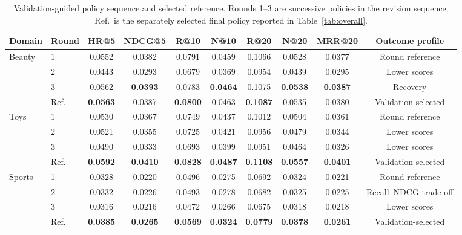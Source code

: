 \begin{table}[b]
\centering
\caption{Validation-guided policy sequence and selected reference. Rounds 1--3 are successive policies in the revision sequence; Ref.\ is the separately selected final policy reported in Table~\ref{tab:overall}.}
\label{tab:three-rounds}
\footnotesize
\setlength{\tabcolsep}{2.8pt}
\begin{tabular}{llcccccccc}
\hline
Domain & Round & HR@5 & NDCG@5 & R@10 & N@10 & R@20 & N@20 & MRR@20 & Outcome profile \\
\hline
\multirow[c]{4}{*}{Beauty} & 1 & 0.0552 & 0.0382 & 0.0791 & 0.0459 & 0.1066 & 0.0528 & 0.0377 & Round reference \\
       & 2 & 0.0443 & 0.0293 & 0.0679 & 0.0369 & 0.0954 & 0.0439 & 0.0295 & Lower scores \\
       & 3 & 0.0562 &\textbf{0.0393}& 0.0783 &\textbf{0.0464}& 0.1075 &\textbf{0.0538}&\textbf{0.0387}& Recovery \\
 \rowcolor{methodblue}      & Ref. &\textbf{0.0563}& 0.0387 &\textbf{0.0800}& 0.0463 &\textbf{0.1087}& 0.0535 & 0.0380 & Validation-selected \\
\hline
\multirow[c]{4}{*}{Toys}   & 1 & 0.0530 & 0.0367 & 0.0749 & 0.0437 & 0.1012 & 0.0504 & 0.0361 & Round reference \\
       & 2 & 0.0521 & 0.0355 & 0.0725 & 0.0421 & 0.0956 & 0.0479 & 0.0344 & Lower scores \\
       & 3 & 0.0490 & 0.0333 & 0.0693 & 0.0399 & 0.0951 & 0.0464 & 0.0326 & Lower scores \\
 \rowcolor{methodblue}      & Ref. &\textbf{0.0592}&\textbf{0.0410}&\textbf{0.0828}&\textbf{0.0487}&\textbf{0.1108}&\textbf{0.0557}&\textbf{0.0401}& Validation-selected \\
\hline
\multirow[c]{4}{*}{Sports} & 1 & 0.0328 & 0.0220 & 0.0496 & 0.0275 & 0.0692 & 0.0324 & 0.0221 & Round reference \\
       & 2 & 0.0332 & 0.0226 & 0.0493 & 0.0278 & 0.0682 & 0.0325 & 0.0225 & Recall--NDCG trade-off \\
       & 3 & 0.0316 & 0.0216 & 0.0472 & 0.0266 & 0.0675 & 0.0318 & 0.0218 & Lower scores \\
 \rowcolor{methodblue}      & Ref. &\textbf{0.0385}&\textbf{0.0265}&\textbf{0.0569}&\textbf{0.0324}&\textbf{0.0779}&\textbf{0.0378}&\textbf{0.0261}& Validation-selected \\
\hline
\end{tabular}
\end{table}
\FloatBarrier

